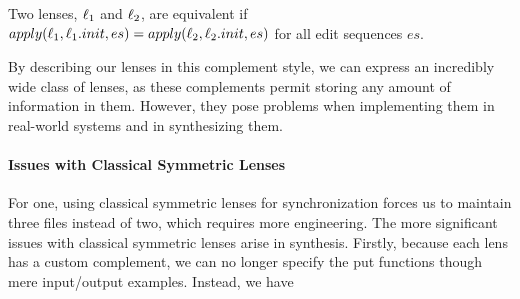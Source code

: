 \documentclass[acmsmall,screen,anonymous]{acmart}
\begin{document}
Two lenses, $\mathit{\ell}_1$ and $\mathit{\ell}_2$, are equivalent if
$apply(\mathit{\ell}_1,\mathit{\ell}_1.init,es) = apply(\mathit{\ell}_2,\mathit{\ell}_2.init,es)$ for all edit
sequences $es$.

By describing our lenses in this complement style, we can express an incredibly
wide class of lenses, as these complements permit storing any amount of
information in them.  However, they pose problems when implementing them in
real-world systems and in synthesizing them.

\paragraph*{Issues with Classical Symmetric Lenses}

For one, using classical symmetric lenses for synchronization forces us to maintain three files instead of two, which requires more engineering.
The more significant issues with classical symmetric lenses arise in synthesis.
Firstly, because each lens has a custom complement, we can no longer
specify the put functions though mere input/output examples.  Instead, we have
\end{document}
